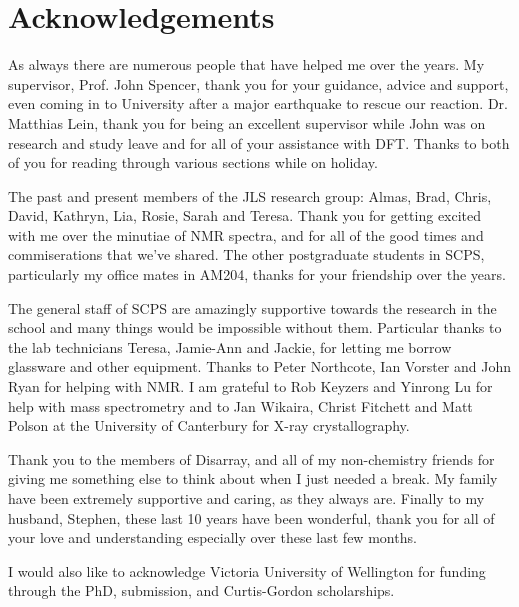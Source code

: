 
\chapter*{Acknowledgements}
\label{ch:acknowledgements}

As always there are numerous people that have helped me over the years.  My supervisor, Prof. John Spencer, thank you for your guidance, advice and support, even coming in to University after a major earthquake to rescue our reaction. Dr. Matthias Lein, thank you for being an excellent supervisor while John was on research and study leave and for all of your assistance with DFT.  Thanks to both of you for reading through various sections while on holiday.

The past and present members of the JLS research group: Almas, Brad, Chris, David, Kathryn, Lia, Rosie, Sarah and Teresa.  Thank you for getting excited with me over the minutiae of NMR spectra, and for all of the good times and commiserations that we've shared.  The other postgraduate students in SCPS, particularly my office mates in AM204, thanks for your friendship over the years.

The general staff of SCPS are amazingly supportive towards the research in the school and many things would be impossible without them.  Particular thanks to the lab technicians Teresa, Jamie-Ann and Jackie, for letting me borrow glassware and other equipment.  Thanks to Peter Northcote, Ian Vorster and John Ryan for helping with NMR.  I am grateful to Rob Keyzers and Yinrong Lu for help with mass spectrometry and to Jan Wikaira, Christ Fitchett and Matt Polson at the 	University of Canterbury for X-ray crystallography.  

Thank you to the members of Disarray, and all of my non-chemistry friends for giving me something else to think about when I just needed a break.  My family have been extremely supportive and caring, as they always are.  Finally to my husband, Stephen, these last 10 years have been wonderful, thank you for all of your love and understanding especially over these last few months.

I would also like to acknowledge Victoria University of Wellington for funding through the PhD, submission, and Curtis-Gordon scholarships.  
%
